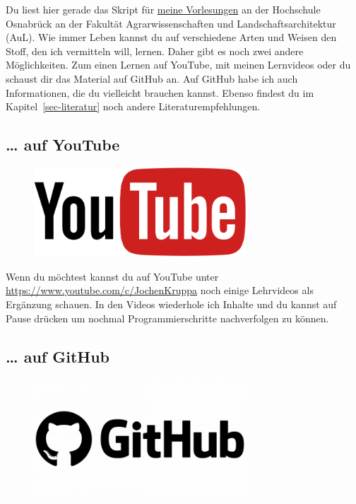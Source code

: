 \documentclass[
  letterpaper,
]{scrbook}
\begin{document}
Du liest hier gerade das Skript für
\protect\hyperlink{sec-vorlesungen-hs}{meine Vorlesungen} an der
Hochschule Osnabrück an der Fakultät Agrarwissenschaften und
Landschaftsarchitektur (AuL). Wie immer Leben kannst du auf verschiedene
Arten und Weisen den Stoff, den ich vermitteln will, lernen. Daher gibt
es noch zwei andere Möglichkeiten. Zum einen Lernen auf YouTube, mit
meinen Lernvideos oder du schaust dir das Material auf GitHub an. Auf
GitHub habe ich auch Informationen, die du vielleicht brauchen kannst.
Ebenso findest du im Kapitel~\ref{sec-literatur} noch andere
Literaturempfehlungen.

\hypertarget{auf-youtube}{%
\subsection*{\ldots{} auf YouTube}\label{auf-youtube}}

\begin{figure}

{\centering \includegraphics[width=3.125in,height=\textheight]{./images/youtube.png}

}

\end{figure}

Wenn du möchtest kannst du auf YouTube unter
\url{https://www.youtube.com/c/JochenKruppa} noch einige Lehrvideos als
Ergänzung schauen. In den Videos wiederhole ich Inhalte und du kannst
auf Pause drücken um nochmal Programmierschritte nachverfolgen zu
können.

\hypertarget{auf-github}{%
\subsection*{\ldots{} auf GitHub}\label{auf-github}}

\begin{figure}

{\centering \includegraphics[width=3.125in,height=\textheight]{./images/github.png}

}

\end{figure}
\end{document}
